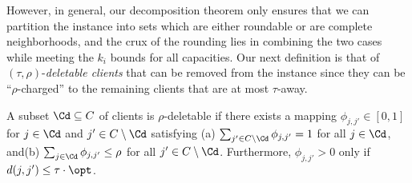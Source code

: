 However, in general, our decomposition theorem only ensures that we can partition the instance into sets which are either roundable or are complete neighborhoods, and the crux of the rounding lies in combining the two cases while meeting the $k_i$ bounds for all capacities. Our next definition is that of $(\tau,\rho)$-{\em deletable clients} that can be removed from the instance since they can be ``$\rho$-charged'' to the remaining clients that are at most $\tau$-away.
\begin{definition}\label{def:deletable}
	A subset $\Cd\subseteq C$ of clients is $\rho$-deletable if there exists a mapping $\phi_{j,j'}\in [0,1]$ for $j\in \Cd$ and $j'\in C\setminus \Cd$ satisfying (a) $\sum_{j'\in C\setminus \Cd} \phi_{j,j'} = 1$ for all $j\in \Cd$, and(b) $\sum_{j\in \Cd} \phi_{j,j'} \leq \rho$ for all $j'\in C\setminus \Cd$. Furthermore, $\phi_{j,j'} > 0$ only if $d(j,j') \leq \tau\cdot\opt$.







\end{definition}
\iffalse
 The following claim shows we can remove $\Cd$ from consideration.
\begin{claim}\label{clm:prelim3}
	Let $\Cd$ be a $(\rho,\tau)$-deletable set.
	Given an $(a,b)$-approximate feasible solution $(x',\y)$ where $x'_{ijp}$ is defined only for $j\in C\setminus \Cd$, we can extend $x'$ to a general $(x,\y)$ solution
	which is $(a+\tau, b(1+\rho))$-approximate feasible.
\end{claim}
\begin{proof}
For any $j\in \Cd$, define $x_{ijp} = \sum_{j'\in C\setminus \Cd} x_{ij'p}\phi_{j,j'}$.
We get for all $j\in \Cd$,
$\textstyle \sum_{i\in F} \sum_{p\in [P]} x_{ijp} = \sum_{i,p} \sum_{j'\in C\setminus \Cd} x_{ij'p}\phi_{j,j'} = \sum_{j'\in C\setminus \Cd} \phi_{j,j'} \left(\sum_{i,p} x_{ij'p}\right) \geq \sum_{j'\in C\setminus \Cd} \phi_{j,j'} = 1$,
and for all $i\in F,p\in [P]$,
$\textstyle \sum_{j\in \Cd}  x_{ijp} = \sum_{j\in \Cd} \sum_{j'\in C\setminus \Cd} x_{ij'p}\phi_{j,j'} = \sum_{j'\in C\setminus \Cd} x_{ij'p}\left( \sum_{j\in \Cd} \phi_{j,j'}\right)  \leq \rho \sum_{j'\in C\setminus \Cd} x_{ijp} \leq b\rho c_p$. Therefore, in all we have $\sum_{j\in C} x_{ijp} \leq bc_p(1+\rho)$.
\end{proof}
\fi



